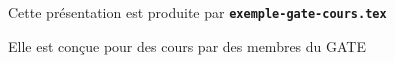 
  \item Cette présentation est produite par \texttt{\textbf{exemple-gate-cours.tex}}
  \item Elle est conçue pour des cours par des membres du GATE
